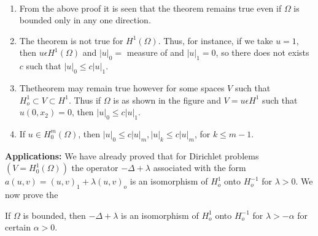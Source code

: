 \begin{remarks*}
~
\begin{enumerate}[(1)]
\item From the above proof it is seen that the theorem remains true
  even if $ \Omega$ is bounded only in any one direction. 
\item The theorem is not true for $H^1 (\Omega)$. Thus, for instance,
  if we take $u = 1$, then $u \epsilon H^1 (\Omega) $ and $|u|_0=$
  measure of and $|u|_1 = 0$, so there does not exists $c$ such that
  $|u|_0 \le c|u|_1$. 
\item The\pageoriginale theorem may remain true however for some spaces $V$ such that
  $H^1_o \subset V \subset H^1$. Thus if $\Omega$ is as shown in the
  figure and $V = u \epsilon H^1$ such that $u(0, x_2) = 0$, then
  $|u|_0 \le c |u|_1$. 
  \begin{figure}[H]
  \end{figure}
\item If $u \in H^m_0 (\Omega)$, then $|u|_0 \le c|u|_m, |u|_k \le
  c|u|_m$, for $k \le m-1$. 
\end{enumerate}
\end{remarks*}

\noindent
\textbf{Applications: } We have already proved that for Dirichlet
problems $(V = H^1_0(\Omega))$ the operator $-\Delta + \lambda$
associated with the form $a(u, v) = (u, v)_1 + \lambda (u, v)_o$ is an
isomorphism of $H^1_o$ onto $H^{-1}_o$ for $\lambda > 0$. We now prove
the  
\begin{theorem}\label{lec8:sec4:subsec1:thm4.2}%
  If $\Omega$ is bounded, then $- \Delta + \lambda$ is an isomorphism of
  $H^1_o$ onto $H^{-1}_o$ for $\lambda > - \alpha$ for certain $\alpha >
  0$. 
\end{theorem}

